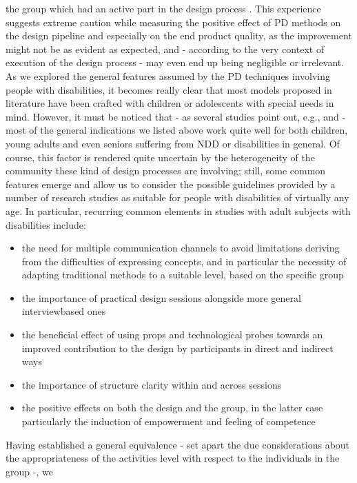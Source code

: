 the group which had an active part in the design process \cite{Benton2}. This experience suggests extreme caution while measuring the positive effect of PD methods on the design pipeline and especially on the end product quality, as the improvement might not be as evident as expected, and - according to the very context of execution of the design process - may even end up being negligible or irrelevant.\\

As we explored the general features assumed by the PD techniques involving people with
disabilities, it becomes really clear that most models proposed in literature have been
crafted with children or adolescents with special needs in mind. However, it must be noticed that - as several studies point out, e.g.\cite{Diciasette},\cite{Diciotto} and \cite{Diciannove} - most
of the general indications we listed above work quite well for both children, young adults
and even seniors suffering from NDD or disabilities in general. Of course, this factor is
rendered quite uncertain by the heterogeneity of the community these kind of design
processes are involving; still, some common features emerge and allow us to consider the
possible guidelines provided by a number of research studies as suitable for people with
disabilities of virtually any age. In particular, recurring common elements in studies with
adult subjects with disabilities include:
\begin{itemize}
\item the need for multiple communication channels to avoid limitations deriving from
the difficulties of expressing concepts, and in particular the necessity of adapting
traditional methods to a suitable level, based on the specific group
\item the importance of practical design sessions alongside more general interviewbased
ones
\item the beneficial effect of using props and technological probes towards an improved
contribution to the design by participants in direct and indirect ways
\item the importance of structure clarity within and across sessions
\item the positive effects on both the design and the group, in the latter case particularly
the induction of empowerment and feeling of competence
\end{itemize}
Having established a general equivalence - set apart the due considerations about the
appropriateness of the activities level with respect to the individuals in the group -, we
